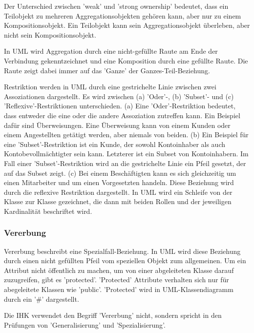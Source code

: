 Der Unterschied zwischen 'weak' und 'strong ownership' bedeutet, dass ein Teilobjekt zu mehreren Aggregationsobjekten gehören kann, aber nur zu einem Kompositionsobjekt. Ein Teilobjekt kann sein Aggregationsobjekt überleben, aber nicht sein Kompositionsobjekt.

In UML wird Aggregation durch eine nicht-gefüllte Raute am Ende der Verbindung gekenntzeichnet und eine Komposition durch eine gefüllte Raute. Die Raute zeigt dabei immer auf das 'Ganze' der Ganzes-Teil-Beziehung.

Restriktion werden in UML durch eine gestrichelte Linie zwischen zwei Assoziationen dargestellt. Es wird zwischen (a) 'Oder'-, (b) 'Subset'- und (c) 'Reflexive'-Restriktionen unterschieden. (a) Eine 'Oder'-Restriktion bedeutet, dass entweder die eine oder die andere Assoziation zutreffen kann. Ein Beispiel dafür sind Überweisungen. Eine Überweisung kann von einem Kunden oder einem Angestellten getätigt werden, aber niemals von beiden. (b) Ein Beispiel für eine 'Subset'-Restriktion ist ein Kunde, der sowohl Kontoinhaber als auch Kontobevollmächtigter sein kann. Letzterer ist ein Subset von Kontoinhabern. Im Fall einer 'Subset'-Restriktion wird an die gestrichelte Linie ein Pfeil gesetzt, der auf das Subset zeigt. (c) Bei einem Beschäftigten kann es sich gleichzeitig um einen Mitarbeiter und um einen Vorgesetzten handeln. Diese Beziehung wird durch die reflexive Restriktion dargestellt. In UML wird ein Schleife von der Klasse zur Klasse gezeichnet, die dann mit beiden Rollen und der jeweiligen Kardinalität beschriftet wird.

\subsubsection{Vererbung}

Vererbung beschreibt eine Spezialfall-Beziehung. In UML wird diese Beziehung durch einen nicht gefüllten Pfeil vom speziellen Objekt zum allgemeinen. Um ein Attribut nicht öffentlich zu machen, um von einer abgeleiteten Klasse darauf zuzugreifen, gibt es 'protected'. 'Protected' Attribute verhalten sich nur für abegeleitete Klassen wie 'public'. 'Protected' wird in UML-Klassendiagramm durch ein '#' dargestellt.

Die IHK verwendet den Begriff 'Vererbung' nicht, sondern spricht in den Prüfungen von 'Generalisierung' und 'Spezialisierung'.